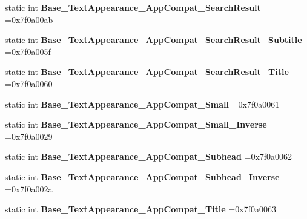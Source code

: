 \begin{DoxyCompactItemize}
static int {\bfseries Base\+\_\+\+Text\+Appearance\+\_\+\+App\+Compat\+\_\+\+Search\+Result} =0x7f0a00ab
\item 
\mbox{\label{classandroid_1_1support_1_1v4_1_1R_1_1style_a73f29f6f8c5fe620576a3b4f93b9e108}} 
static int {\bfseries Base\+\_\+\+Text\+Appearance\+\_\+\+App\+Compat\+\_\+\+Search\+Result\+\_\+\+Subtitle} =0x7f0a005f
\item 
\mbox{\label{classandroid_1_1support_1_1v4_1_1R_1_1style_adfef6540918bee747a80a69774270b2e}} 
static int {\bfseries Base\+\_\+\+Text\+Appearance\+\_\+\+App\+Compat\+\_\+\+Search\+Result\+\_\+\+Title} =0x7f0a0060
\item 
\mbox{\label{classandroid_1_1support_1_1v4_1_1R_1_1style_a5228f1c5423da9dbc9dfdcc3673b0622}} 
static int {\bfseries Base\+\_\+\+Text\+Appearance\+\_\+\+App\+Compat\+\_\+\+Small} =0x7f0a0061
\item 
\mbox{\label{classandroid_1_1support_1_1v4_1_1R_1_1style_a89e16f6d7a81e1f2427687717705048d}} 
static int {\bfseries Base\+\_\+\+Text\+Appearance\+\_\+\+App\+Compat\+\_\+\+Small\+\_\+\+Inverse} =0x7f0a0029
\item 
\mbox{\label{classandroid_1_1support_1_1v4_1_1R_1_1style_a7294ae8f8ab92c58b90c66d225dc34fb}} 
static int {\bfseries Base\+\_\+\+Text\+Appearance\+\_\+\+App\+Compat\+\_\+\+Subhead} =0x7f0a0062
\item 
\mbox{\label{classandroid_1_1support_1_1v4_1_1R_1_1style_a5ab9a517f353f6e2c024fa9f3f8ce284}} 
static int {\bfseries Base\+\_\+\+Text\+Appearance\+\_\+\+App\+Compat\+\_\+\+Subhead\+\_\+\+Inverse} =0x7f0a002a
\item 
\mbox{\label{classandroid_1_1support_1_1v4_1_1R_1_1style_ac946628d59c4b4b2be926930964e1e36}} 
static int {\bfseries Base\+\_\+\+Text\+Appearance\+\_\+\+App\+Compat\+\_\+\+Title} =0x7f0a0063
\item 
\mbox{\label{classandroid_1_1support_1_1v4_1_1R_1_1style_ab4ae0bb6d3cf933d20e19f0a30543824}} 

\end{DoxyCompactItemize}
